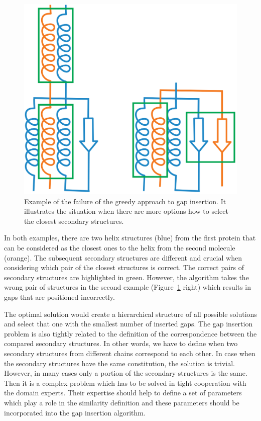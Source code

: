 \documentclass[twocolumn]{bmcart}%
\begin{document}
\begin{figure}[thb]
  \centering
  \includegraphics[width=0.9\linewidth]{pics/fail.png}
  \caption{Example of the failure of the greedy approach to gap insertion. It illustrates the situation when there are more options how to select the closest secondary structures.}
  \label{fig:fail}
\end{figure}

In both examples, there are two helix structures (blue) from the first protein that can be considered as the closest ones to the helix from the second molecule (orange).
The subsequent secondary structures are different and crucial when considering which pair of the closest structures is correct. 
The correct pairs of secondary structures are highlighted in green.
However, the algorithm takes the wrong pair of structures in the second example (Figure~\ref{fig:fail} right) which results in gaps that are positioned incorrectly.


The optimal solution would create a hierarchical structure of all possible solutions and select that one with the smallest number of inserted gaps.
The gap insertion problem is also tightly related to the definition of the correspondence between the compared secondary structures.
In other words, we have to define when two secondary structures from different chains correspond to each other.
In case when the secondary structures have the same constitution, the solution is trivial.
However, in many cases only a portion of the secondary structures is the same.
Then it is a complex problem which has to be solved in tight cooperation with the domain experts.
Their expertise should help to define a set of parameters which play a role in the similarity definition and these parameters should be incorporated into the gap insertion algorithm. 
\end{document}
